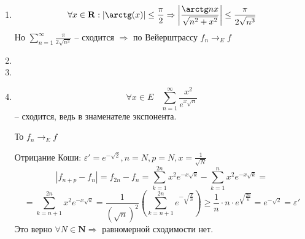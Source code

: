 \documentclass[11pt]{article}
\begin{document}
\begin{enumerate}
		\item $$\forall x \in \mathbf{R}: |\arctg(x)|\le \frac{\pi}{2}\Rightarrow \left| \frac{\arctg nx}{\sqrt{n^2+x^2}} \right|\le \frac{\pi}{2\sqrt{n^3}}$$ Но $\sum_{n=1}^{\infty}\frac{\pi}{2\sqrt{n^3}}$ -- сходится $\Rightarrow$ по Вейерштрассу $f_n\to_E f$
		\item 
		\item 
		\item $$\forall x \in E \:\:\:\: \sum_{n=1}^{\infty} \frac{x^2}{e^{x\sqrt{n}}}$$ -- сходится, ведь в знаменателе экспонента.
		
		То $f_n\to_E f$
		
		Отрицание Коши: $\varepsilon'=e^{-\sqrt{2}},n=N,p=N,x=\frac{1}{\sqrt{N}}$
		$$|f_{n+p}-f_n| = f_{2n}-f_n = \sum_{k=1}^{2n}x^2 e^{-x\sqrt{k}}-\sum_{k=1}^{n}x^2 e^{-x\sqrt{k}}=$$
		$$=\sum_{k = n+1}^{2n}x^2e^{-x\sqrt{k}}=\frac{1}{(\sqrt{n})^2}\left(\sum_{k=n+1}^{2n}e^{-\sqrt{\frac{k}{n}}}\right)\ge \frac{1}{n}\cdot n\cdot e^{\sqrt{\frac{2n}{n}}} = e^{-\sqrt{2}} = \varepsilon'$$ Это верно $\forall N\in \mathbf{N}\Rightarrow$ равномерной сходимости нет.
	\end{enumerate}
\end{document}
